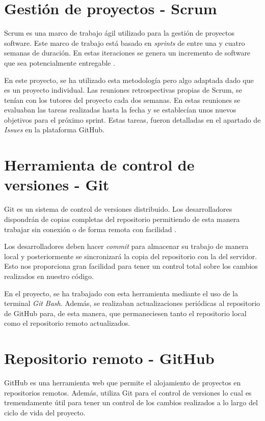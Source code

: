 
\section{Gestión de proyectos - Scrum}
Scrum es una marco de trabajo ágil utilizado para la gestión de proyectos software. Este marco de trabajo está basado en \textit{sprints} de entre una y cuatro semanas de duración. En estas iteraciones se genera un incremento de software que sea potencialmente entregable \cite{scrum:latex}.

En este proyecto, se ha utilizado esta metodología pero algo adaptada dado que es un proyecto individual. Las reuniones retrospectivas propias de Scrum, se tenían con los tutores del proyecto cada dos semanas. En estas reuniones se evaluaban las tareas realizadas hasta la fecha y se establecían unos nuevos objetivos para el próximo sprint. Estas tareas, fueron detalladas en el apartado de \textit{Issues} en la plataforma GitHub.  

\section{Herramienta de control de versiones - Git}
Git es un sistema de control de versiones distribuido. Los desarrolladores dispondrán de copias completas del repositorio permitiendo de esta manera trabajar sin conexión o de forma remota con facilidad \cite{git:latex}.

Los desarrolladores deben hacer \textit{commit} para almacenar su trabajo de manera local y posteriormente se sincronizará la copia del repositorio con la del servidor. Esto nos proporciona gran facilidad para tener un control total sobre los cambios realizados en nuestro código.

En el proyecto, se ha trabajado con esta herramienta mediante el uso de la terminal \textit{Git Bash}. Además, se realizaban actualizaciones periódicas al repositorio de GitHub para, de esta manera, que permaneciesen tanto el repositorio local como el repositorio remoto actualizados.

\section{Repositorio remoto - GitHub}
GitHub es una herramienta web que permite el alojamiento de proyectos en repositorios remotos. Además, utiliza Git para el control de versiones lo cual es tremendamente útil para tener un control de los cambios realizados a lo largo del ciclo de vida del proyecto. 

